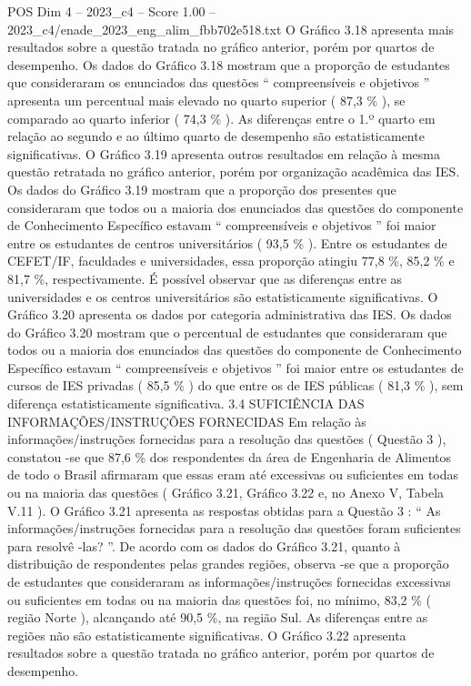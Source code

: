 \begin{textsample}{POS Dim 4 – 2023\_c4 – Score 1.00 – 2023\_c4/enade\_2023\_eng\_alim\_fbb702e518.txt}
O Gráfico 3.18 apresenta mais resultados sobre a questão tratada no gráfico anterior, porém por quartos de desempenho.
Os dados do Gráfico 3.18 mostram que a proporção de estudantes que consideraram os enunciados das questões “ compreensíveis e objetivos ” apresenta um percentual mais elevado no quarto superior ( 87,3 \% ), se comparado ao quarto inferior ( 74,3 \% ).
As diferenças entre o 1.º quarto em relação ao segundo e ao último quarto de desempenho são estatisticamente significativas.
O Gráfico 3.19 apresenta outros resultados em relação à mesma questão retratada no gráfico anterior, porém por organização acadêmica das IES.
Os dados do Gráfico 3.19 mostram que a proporção dos presentes que consideraram que todos ou a maioria dos enunciados das questões do componente de Conhecimento Específico estavam “ compreensíveis e objetivos ” foi maior entre os estudantes de centros universitários ( 93,5 \% ).
Entre os estudantes de CEFET/IF, faculdades e universidades, essa proporção atingiu 77,8 \%, 85,2 \% e 81,7 \%, respectivamente.
É possível observar que as diferenças entre as universidades e os centros universitários são estatisticamente significativas.
O Gráfico 3.20 apresenta os dados por categoria administrativa das IES.
Os dados do Gráfico 3.20 mostram que o percentual de estudantes que consideraram que todos ou a maioria dos enunciados das questões do componente de Conhecimento Específico estavam “ compreensíveis e objetivos ” foi maior entre os estudantes de cursos de IES privadas ( 85,5 \% ) do que entre os de IES públicas ( 81,3 \% ), sem diferença estatisticamente significativa. 3.4 SUFICIÊNCIA DAS INFORMAÇÕES/INSTRUÇÕES FORNECIDAS Em relação às informações/instruções fornecidas para a resolução das questões ( Questão 3 ), constatou -se que 87,6 \% dos respondentes da área de Engenharia de Alimentos de todo o Brasil afirmaram que essas eram até excessivas ou suficientes em todas ou na maioria das questões ( Gráfico 3.21, Gráfico 3.22 e, no Anexo V, Tabela V.11 ).
O Gráfico 3.21 apresenta as respostas obtidas para a Questão 3 : “ As informações/instruções fornecidas para a resolução das questões foram suficientes para resolvê -las? ”.
De acordo com os dados do Gráfico 3.21, quanto à distribuição de respondentes pelas grandes regiões, observa -se que a proporção de estudantes que consideraram as informações/instruções fornecidas excessivas ou suficientes em todas ou na maioria das questões foi, no mínimo, 83,2 \% ( região Norte ), alcançando até 90,5 \%, na região Sul.
As diferenças entre as regiões não são estatisticamente significativas.
O Gráfico 3.22 apresenta resultados sobre a questão tratada no gráfico anterior, porém por quartos de desempenho.

\end{textsample}
